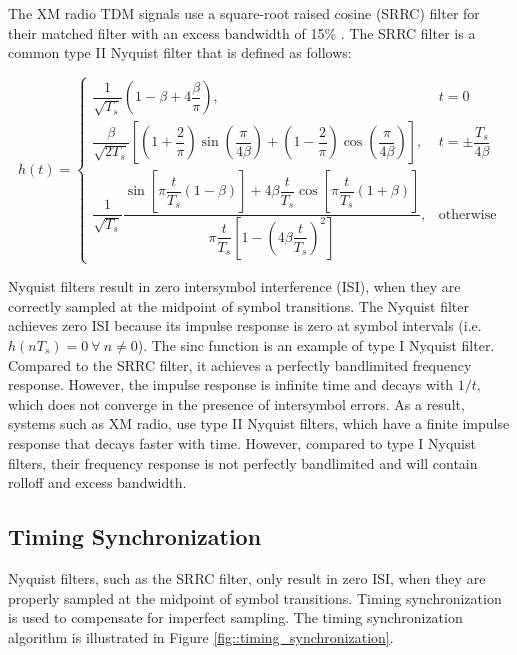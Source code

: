 \documentclass[conference,onecolumn]{IEEEtran}
\begin{document}
The XM radio TDM signals use a square-root raised cosine (SRRC) filter for their matched filter with an excess bandwidth of 15\% \cite{a2008_us8260192b2}. The SRRC filter is a common type II Nyquist filter that is defined as follows:

\begin{equation}
	h(t) = \begin{cases}
		\dfrac{1}{\sqrt{T_s}}\left(1 - \beta + 4\dfrac{\beta}{\pi}\right), & t = 0 \\[12pt]
		\dfrac{\beta}{\sqrt{2T_s}}\left[\left(1 + \dfrac{2}{\pi}\right)\sin\left(\dfrac{\pi}{4\beta}\right)+ \left(1-\dfrac{2}{\pi}\right)\cos\left(\dfrac{\pi}{4\beta}\right)\right], & t = \pm\dfrac{T_s}{4\beta} \\[12pt]
		\dfrac{1}{\sqrt{T_s}}\dfrac{\sin\left[\pi\dfrac{t}{T_s}(1-\beta)\right]+4\beta\dfrac{t}{T_s}\cos\left[\pi\dfrac{t}{T_s}(1+\beta)\right]}{\pi\dfrac{t}{T_s}\left[1 - \left(4\beta\dfrac{t}{T_s}\right)^2\right]}, & \text{otherwise}
	\end{cases}
	\label{eq::srrc_filter}
\end{equation}

	Nyquist filters result in zero intersymbol interference (ISI), when they are correctly sampled at the midpoint of symbol transitions.  The Nyquist filter achieves zero ISI because its impulse response is zero at symbol intervals (i.e. $h(nT_s) = 0 \ \forall\ n \neq 0$). The sinc function is an example of type I Nyquist filter. Compared to the SRRC filter, it achieves a perfectly bandlimited frequency response. However, the impulse response is infinite time and decays with $1/t$, which does not converge in the presence of intersymbol errors. As a result, systems such as XM radio, use type II Nyquist filters, which have a finite impulse response that decays faster with time. However, compared to type I Nyquist filters, their frequency response is not perfectly bandlimited and will contain rolloff and excess bandwidth.
 
\subsection{Timing Synchronization}

	Nyquist filters, such as the SRRC filter, only result in zero ISI, when they are properly sampled at the midpoint of symbol transitions. Timing synchronization is used to compensate for imperfect sampling. The timing synchronization algorithm is illustrated in Figure \ref{fig::timing_synchronization}.
\end{document}
